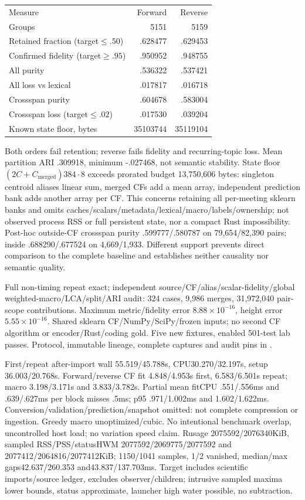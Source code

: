 \documentclass[11pt]{article}
\begin{document}
\begin{center}\begin{tabular}{lrr}
Measure & Forward & Reverse \\
Groups & 5151 & 5159 \\
Retained fraction (target$\le.50$) & .628477 & .629453 \\
Confirmed fidelity (target$\ge.95$) & .950952 & .948755 \\
All purity & .536322 & .537421 \\
All loss vs lexical & .017817 & .016718 \\
Crossspan purity & .604678 & .583004 \\
Crossspan loss (target$\le.02$) & .017530 & .039204 \\
Known state floor, bytes & 35103744 & 35119104
\end{tabular}\end{center}

Both orders fail retention; reverse fails fidelity and recurring-topic loss.
Mean partition ARI .309918, minimum -.027468, not semantic stability. State floor
$(2C+C_{\mathrm{merged}})384\cdot8$ exceeds prorated budget 13,750,606 bytes:
singleton centroid aliases linear sum, merged CFs add a mean array, independent
prediction bank adds another array per CF. This concerns retaining all per-meeting
sklearn banks and omits caches/scalars/metadata/lexical/macro/labels/ownership;
not observed process RSS or full persistent state, nor a compact Rust impossibility.
Post-hoc outside-CF crossspan purity .599777/.580787 on 79,654/82,390 pairs;
inside .688290/.677524 on 4,669/1,933. Different support prevents direct comparison
to the complete baseline and establishes neither causality nor semantic quality.

Full non-timing repeat exact; independent source/CF/alias/scalar-fidelity/global
weighted-macro/LCA/split/ARI audit: 324 cases, 9,986 merges, 31,972,040 pair-scope
contributions. Maximum metric/fidelity error $8.88\times10^{-16}$, height error
$5.55\times10^{-16}$. Shared sklearn CF/NumPy/SciPy/frozen inputs; no second CF
algorithm or encoder/Rust/coding gold. Five new fixtures, enabled 501-test lab
passes. Protocol, immutable lineage, complete captures and audit pins in
.

First/repeat after-import wall 55.519/45.788s, CPU30.270/32.197s, setup
36.003/20.768s. Forward/reverse CF fit 4.848/4.953s first, 6.583/6.501s repeat;
macro 3.198/3.171s and 3.833/3.782s. Partial mean fitCPU .551/.556ms and
.639/.627ms per block misses .5ms; p95 .971/1.002ms and 1.602/1.622ms.
Conversion/validation/prediction/snapshot omitted: not complete compression or
ingestion. Greedy macro unoptimized/cubic. No intentional benchmark overlap,
uncontrolled host load; no variation speed claim. Rusage 2075592/2076340KiB,
sampled RSS/PSS/statusHWM 2077592/2069775/2077592 and
2077412/2064816/2077412KiB; 1150/1041 samples, 1/2 vanished,
median/max gaps42.637/260.353 and43.837/137.703ms. Target includes scientific
imports/source ledger, excludes observer/children; intrusive sampled maxima lower
bounds, status approximate, launcher high water possible, no subtraction.
\end{document}
